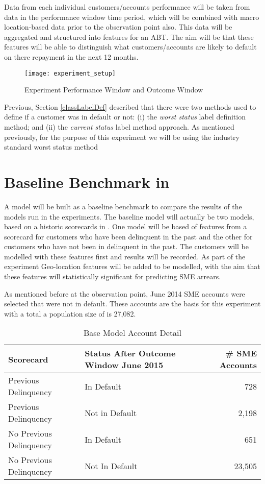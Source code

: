 Data from each individual customers/accounts performance will be taken from data in the performance window time period, which will be combined with macro location-based data prior to the observation point also. This data will be aggregated and structured into features for an ABT. The aim will be that these features will be able to distinguish what customers/accounts are likely to default on there repayment in the next 12 months. 

\begin{figure}[h!]
	\texttt{[image: experiment\_setup]}
	\caption[Experiment Performance Window and Outcome Window]
	{Experiment Performance Window and Outcome Window}
	\label{fig:experiment_setup}
\end{figure}

Previous, Section \ref{classLabelDef} described that there were two methods used to define if a customer was in default or not: (i) the \textit{worst status} label definition method; and (ii) the \textit{current status} label method approach. As mentioned previously, for the purpose of this experiment we will be using the industry standard worst status method

\section{Baseline Benchmark in \subjectname\ }
A model will be built as a baseline benchmark to compare the results of the models run in the experiments. The baseline model will actually be two models, based on a historic scorecards in \subjectname. One model will be based of features from a scorecard for customers who have been delinquent in the past and the other for customers who have not been in delinquent in the past. The customers will be modelled with these features first and results will be recorded. As part of the experiment Geo-location features will be added to be modelled, with the aim that these features will statistically significant for predicting SME arrears. 

As mentioned before at the observation point, June 2014 SME accounts were selected that were not in default. These accounts are the basis for this experiment with a total a population size of is 27,082. 


\begin{table}[H]
	\centering
	\begin{tabular}{l| p{5cm}| r}
		\hline
		\textbf{Scorecard} & \textbf{Status After Outcome Window June 2015} & \textbf{\# SME Accounts} \\
		\hline
		Previous Delinquency          & In Default        & 728 \\
		Previous Delinquency          & Not in Default        & 2,198 \\ 
		No Previous Delinquency          & In Default        & 651 \\ 
		No Previous Delinquency          & Not In Default        & 23,505 \\
		\hline
	\end{tabular}
	\caption{Base Model Account Detail}
\end{table}

